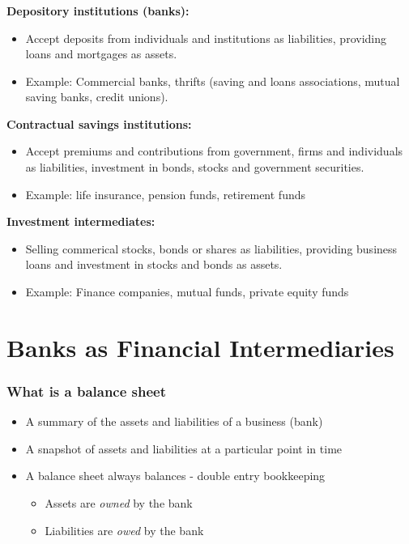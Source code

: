 \documentclass[11pt]{beamer}
\begin{document}

\begin{frame}
\frametitle{\insertsection}

\textbf{Depository institutions (banks):}
\begin{itemize}
\item Accept deposits from individuals and institutions as liabilities, providing loans and mortgages as assets.
\item Example: Commercial banks, thrifts (saving and loans associations, mutual saving banks, credit unions).
\end{itemize}

\textbf{Contractual savings institutions:}
\begin{itemize}
\item Accept premiums and contributions from government, firms and individuals as liabilities, investment in bonds, stocks and government securities.
\item Example: life insurance, pension funds, retirement funds
\end{itemize}

\textbf{Investment intermediates:}
\begin{itemize}
\item Selling commerical stocks, bonds or shares as liabilities, providing business loans and investment in stocks and bonds as assets.
\item Example: Finance companies, mutual funds, private equity funds
\end{itemize}

\end{frame}

\section{Banks as Financial Intermediaries}
%

\begin{frame}
\frametitle{What is a balance sheet}
\begin{itemize}
\item A summary of the assets and liabilities of a business (bank)
\item A snapshot of assets and liabilities at a particular point in time
\item A balance sheet always balances - double entry bookkeeping
\begin{itemize}
\item Assets are \textit{owned} by the bank
\item Liabilities are \textit{owed} by the bank
\end{itemize}
\end{itemize}

\end{frame}
\end{document}
